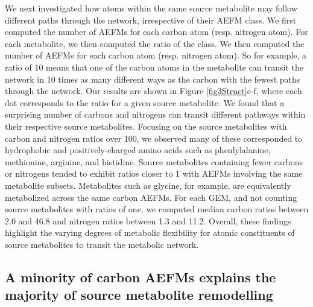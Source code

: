 \documentclass[12pt]{article}
\begin{document}
We next investigated how atoms within the same source metabolite may
follow different paths through the network, irrespective of their AEFM
class. We first computed the number of AEFMs for each carbon atom (resp.
nitrogen atom). For each metabolite, we then computed the ratio of the
class. We then computed the number of AEFMs for each carbon atom (resp.
nitrogen atom). So for example, a ratio of 10 means that one of the carbon
atoms in the metabolite can transit the network in 10 times as many
different ways as the carbon with the fewest paths through the network.
Our results are shown in Figure \ref{fig3Struct}e-f, where each dot
corresponds to the ratio for a given source metabolite. We found that
a surprising number of carbons and nitrogens can transit different
pathways within their respective source metabolites. Focusing on the
source metabolites with carbon and nitrogen ratios over 100, we observed
many of these corresponded to hydrophobic and positively-charged amino
acids such as phenlylalanine, methionine, arginine, and histidine. Source
metabolites containing fewer carbons or nitrogens tended to exhibit ratios
closer to
1 with AEFMs involving the same metabolite subsets. Metabolites such as
  glycine, for example, are equivalently metabolized across the same
  carbon AEFMs. For each GEM, and not counting source metabolites with
  ratios of one, we computed median carbon ratios between
  2.0 and 46.8 and nitrogen ratios between 1.3 and 11.2. Overall, these
  findings highlight the varying degrees of metabolic flexibility for
  atomic constituents of source metabolites to transit the metabolic
  network.

\subsection*{A minority of carbon AEFMs explains the majority of source metabolite remodelling}

\end{document}
